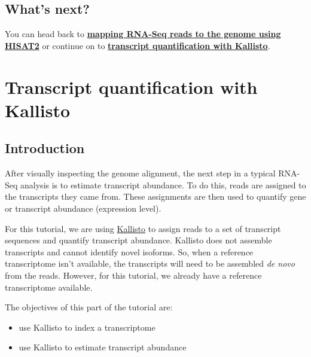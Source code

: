 \documentclass[11pt]{article}
\providecommand{\tightlist}{%
      \setlength{\itemsep}{0pt}\setlength{\parskip}{0pt}}
\begin{document}
    \hypertarget{whats-next}{%
\subsection{What's next?}\label{whats-next}}

You can head back to \textbf{\href{genome-mapping.ipynb}{mapping RNA-Seq
reads to the genome using HISAT2}} or continue on to
\textbf{\href{transcript-quantification.ipynb}{transcript quantification
with Kallisto}}.





\newpage





    \hypertarget{transcript-quantification-with-kallisto}{%
\section{Transcript quantification with
Kallisto}\label{transcript-quantification-with-kallisto}}

    \hypertarget{introduction}{%
\subsection{Introduction}\label{introduction}}

After visually inspecting the genome alignment, the next step in a
typical RNA-Seq analysis is to estimate transcript abundance. To do
this, reads are assigned to the transcripts they came from. These
assignments are then used to quantify gene or transcript abundance
(expression level).

For this tutorial, we are using
\href{https://pachterlab.github.io/kallisto/}{Kallisto} to assign reads
to a set of transcript sequences and quantify transcript abundance.
Kallisto does not assemble transcripts and cannot identify novel
isoforms. So, when a reference transcriptome isn't available, the
transcripts will need to be assembled \textit{de novo} from the reads.
However, for this tutorial, we already have a reference transcriptome
available.

The objectives of this part of the tutorial are:

\begin{itemize}
\tightlist
\item
  use Kallisto to index a transcriptome
\item
  use Kallisto to estimate transcript abundance
\end{itemize}
\end{document}
